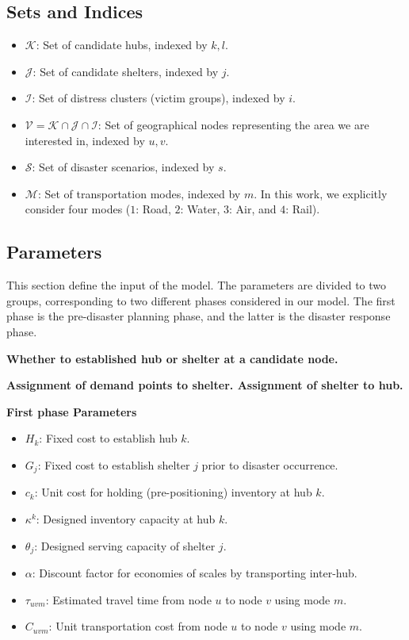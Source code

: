 {\subsection*{Sets and Indices}
\begin{itemize}
    \item $\mathcal{K}$: Set of candidate hubs, indexed by $k, l$.
    \item $\mathcal{J}$: Set of candidate shelters, indexed by $j$.
    \item $\mathcal{I}$: Set of distress clusters (victim groups), indexed by $i$.
    \item $\mathcal{V} = \mathcal{K} \cap \mathcal{J} \cap \mathcal{I}$: Set of  geographical nodes representing the area we are interested in, indexed by $u,v$.
    \item $\mathcal{S}$: Set of disaster scenarios, indexed by $s$.
    \item $\mathcal{M}$: Set of transportation modes, indexed by $m$. In this work, we explicitly consider four modes ($1$: Road, $2$: Water, $3$: Air, and $4$: Rail). %
\end{itemize}

\subsection*{Parameters}
This section define the input of the model. The parameters are divided to two groups, corresponding to two different phases considered in our model. The first phase is the pre-disaster planning phase, and the latter is the disaster response phase.

\textbf{Whether to established hub or shelter at a candidate node.}

\textbf{Assignment of demand points to shelter. Assignment of shelter to hub.}

\textbf{First phase Parameters}
\begin{itemize}
    \item $H_k$: Fixed cost to establish hub $k$.
    \item $G_j$: Fixed cost to establish shelter $j$ prior to disaster occurrence.
    \item $c_k$: Unit cost for holding (pre-positioning) inventory at hub $k$.
    \item $\kappa^k$: Designed inventory capacity at hub $k$. 
    \item $\theta_j$: Designed serving capacity of shelter $j$. %
    \item $\alpha$: Discount factor for economies of scales by transporting inter-hub.
    \item $\tau_{uvm}$: Estimated travel time from node $u$ to node $v$ using mode $m$.
    \item $C_{uvm}$: Unit transportation cost from node $u$ to node $v$ using mode $m$.
 \end{itemize}

}
